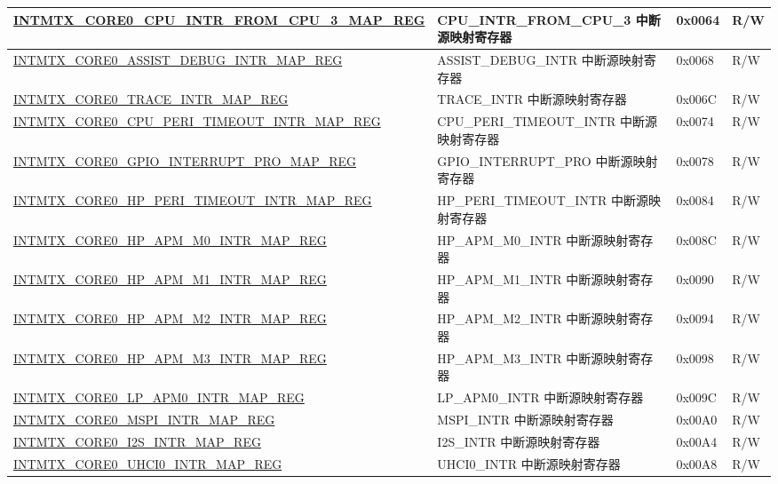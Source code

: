 \begin{longtable}{ | p{10cm} | m{10cm} | m{1.3cm} | m{1.0cm} | }
\hyperref[regdesc:INTMTXCORE0CPUINTRFROMCPU3MAPREG]{INTMTX\_CORE0\_CPU\_INTR\_FROM\_CPU\_3\_MAP\_REG} & CPU\_INTR\_FROM\_CPU\_3 中断源映射寄存器 & 0x0064 & R/W \\ \hline
\hyperref[regdesc:INTMTXCORE0ASSISTDEBUGINTRMAPREG]{INTMTX\_CORE0\_ASSIST\_DEBUG\_INTR\_MAP\_REG} & ASSIST\_DEBUG\_INTR 中断源映射寄存器 & 0x0068 & R/W \\ \hline
\hyperref[regdesc:INTMTXCORE0TRACEINTRMAPREG]{INTMTX\_CORE0\_TRACE\_INTR\_MAP\_REG} & TRACE\_INTR 中断源映射寄存器 & 0x006C & R/W \\ \hline
\hyperref[regdesc:INTMTXCORE0CPUPERITIMEOUTINTRMAPREG]{INTMTX\_CORE0\_CPU\_PERI\_TIMEOUT\_INTR\_MAP\_REG} & CPU\_PERI\_TIMEOUT\_INTR 中断源映射寄存器 & 0x0074 & R/W \\ \hline
\hyperref[regdesc:INTMTXCORE0GPIOINTERRUPTPROMAPREG]{INTMTX\_CORE0\_GPIO\_INTERRUPT\_PRO\_MAP\_REG} & GPIO\_INTERRUPT\_PRO 中断源映射寄存器 & 0x0078 & R/W \\ \hline
\hyperref[regdesc:INTMTXCORE0HPPERITIMEOUTINTRMAPREG]{INTMTX\_CORE0\_HP\_PERI\_TIMEOUT\_INTR\_MAP\_REG} & HP\_PERI\_TIMEOUT\_INTR 中断源映射寄存器 & 0x0084 & R/W \\ \hline
\hyperref[regdesc:INTMTXCORE0HPAPMM0INTRMAPREG]{INTMTX\_CORE0\_HP\_APM\_M0\_INTR\_MAP\_REG} & HP\_APM\_M0\_INTR 中断源映射寄存器 & 0x008C & R/W \\ \hline
\hyperref[regdesc:INTMTXCORE0HPAPMM1INTRMAPREG]{INTMTX\_CORE0\_HP\_APM\_M1\_INTR\_MAP\_REG} & HP\_APM\_M1\_INTR 中断源映射寄存器 & 0x0090 & R/W \\ \hline
\hyperref[regdesc:INTMTXCORE0HPAPMM2INTRMAPREG]{INTMTX\_CORE0\_HP\_APM\_M2\_INTR\_MAP\_REG} & HP\_APM\_M2\_INTR 中断源映射寄存器 & 0x0094 & R/W \\ \hline
\hyperref[regdesc:INTMTXCORE0HPAPMM3INTRMAPREG]{INTMTX\_CORE0\_HP\_APM\_M3\_INTR\_MAP\_REG} & HP\_APM\_M3\_INTR 中断源映射寄存器 & 0x0098 & R/W \\ \hline
\hyperref[regdesc:INTMTXCORE0LPAPM0INTRMAPREG]{INTMTX\_CORE0\_LP\_APM0\_INTR\_MAP\_REG} & LP\_APM0\_INTR 中断源映射寄存器 & 0x009C & R/W \\ \hline
\hyperref[regdesc:INTMTXCORE0MSPIINTRMAPREG]{INTMTX\_CORE0\_MSPI\_INTR\_MAP\_REG} & MSPI\_INTR 中断源映射寄存器 & 0x00A0 & R/W \\ \hline
\hyperref[regdesc:INTMTXCORE0I2SINTRMAPREG]{INTMTX\_CORE0\_I2S\_INTR\_MAP\_REG} & I2S\_INTR 中断源映射寄存器 & 0x00A4 & R/W \\ \hline
\hyperref[regdesc:INTMTXCORE0UHCI0INTRMAPREG]{INTMTX\_CORE0\_UHCI0\_INTR\_MAP\_REG} & UHCI0\_INTR 中断源映射寄存器 & 0x00A8 & R/W \\ \hline

\end{longtable}
